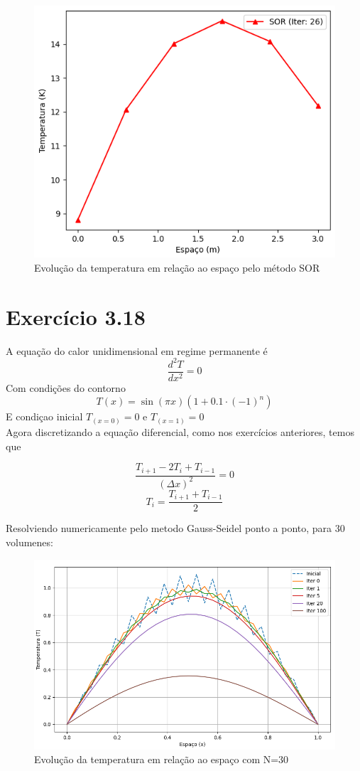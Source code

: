 \documentclass[]{article}
\begin{document}
\begin{figure}[H]
	\centering
	\includegraphics[width=.65\textwidth]{figures/316-3}
	\caption{Evolução da temperatura em relação ao espaço pelo método SOR}
\end{figure}

\section*{Exercício 3.18}
A equação do calor unidimensional em regime permanente é
\begin{equation}
	\frac{d^2 T}{dx^2} = 0
\end{equation}
Com condições do contorno
\begin{equation}
	T(x) = \sin(\pi x) \left( 1 + 0.1 \cdot (-1)^n \right)
\end{equation}
E condiçao inicial $T_{(x=0)}=0 $ e $T_{(x=1)}=0 $\\

Agora discretizando a equação diferencial, como nos exercícios anteriores, temos que

\begin{equation}
	\frac{T_{i+1} - 2T_i + T_{i-1}}{(\Delta x)^2} = 0
\end{equation}
\begin{equation}
	T_i = \frac{T_{i+1} + T_{i-1}}{2}
\end{equation}

Resolviendo numericamente pelo metodo Gauss-Seidel ponto a ponto, para 30 volumenes:

\begin{figure}[H]
	\centering
	\includegraphics[width=.65\textwidth]{figures/318-1-30N}
	\caption{Evolução da temperatura em relação ao espaço com N=30}
\end{figure}
\end{document}
